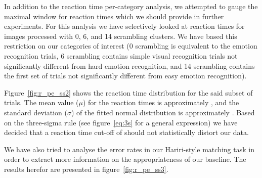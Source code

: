 	    In addition to the reaction time per-category analysis, we attempted to gauge the maximal window for reaction times which we should provide in further experiments.
	    For this analysis we have selectively looked at reaction times for images processed with \SI{0}{\pixel}, \SI{6}{\pixel}, and \SI{14}{\pixel} scrambling clusters.
	    We have based this restriction on our categories of interest 
	    (\SI{0}{\pixel} scrambling is equivalent to the emotion recognition trials, \SI{6}{\pixel} scrambling contains simple visual recognition trials not significantly different from hard emotion recognition, and \SI{14}{\pixel} scrambling contains the first set of trials not significantly different from easy emotion recognition).
	    
	    Figure~\ref{fig:r_pe_ss2} shows the reaction time distribution for the said subset of trials.
	    The mean value ($\mu$) for the reaction times is approximately , 
	    and the standard deviation ($\sigma$) of the fitted normal distribution is approximately .
	    Based on the three-sigma rule (see figure~\ref{eq:3s} for a general expression) we have decided that a reaction time cut-off of  should not statistically distort our data.
	    
	    We have also tried to analyse the error rates in our Hariri-style matching task in order to extract more information on the appropriateness of our baseline.
	    The results herefor are presented in figure~\ref{fig:r_pe_ss3}.
	    
